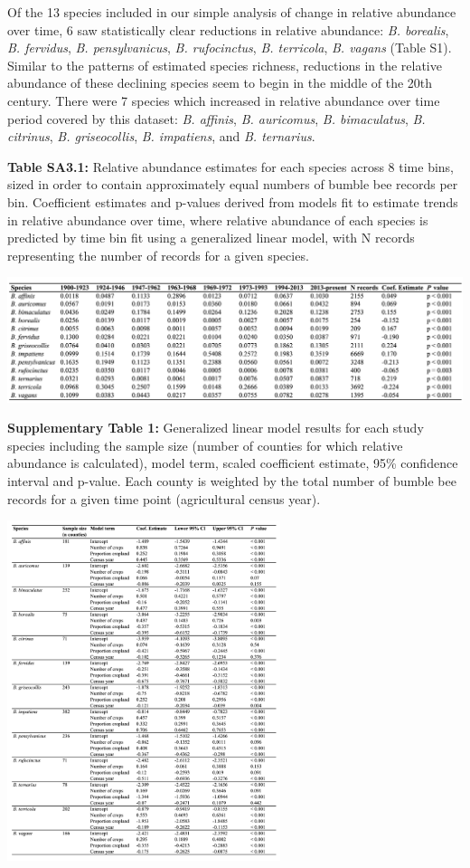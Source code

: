 \documentclass[11pt,]{article}
\begin{document}
Of the 13 species included in our simple analysis of change in relative
abundance over time, 6 saw statistically clear reductions in relative
abundance: \emph{B. borealis}, \emph{B. fervidus}, \emph{B.
pensylvanicus}, \emph{B. rufocinctus}, \emph{B. terricola}, \emph{B.
vagans} (Table S1). Similar to the patterns of estimated species
richness, reductions in the relative abundance of these declining
species seem to begin in the middle of the 20th century. There were 7
species which increased in relative abundance over time period covered
by this dataset: \emph{B. affinis}, \emph{B. auricomus}, \emph{B.
bimaculatus}, \emph{B. citrinus}, \emph{B. griseocollis}, \emph{B.
impatiens}, and \emph{B. ternarius}.

\textbf{Table SA3.1:} Relative abundance estimates for each species
across 8 time bins, sized in order to contain approximately equal
numbers of bumble bee records per bin. Coefficient estimates and
p-values derived from models fit to estimate trends in relative
abundance over time, where relative abundance of each species is
predicted by time bin fit using a generalized linear model, with N
records representing the number of records for a given species.

\includegraphics[width=1\textwidth,height=\textheight]{../ms_figs/table1.png}

\clearpage

\textbf{Supplementary Table 1:} Generalized linear model results for
each study species including the sample size (number of counties for
which relative abundance is calculated), model term, scaled coefficient
estimate, 95\% confidence interval and p-value. Each county is weighted
by the total number of bumble bee records for a given time point
(agricultural census year).

\includegraphics[width=0.6\textwidth,height=\textheight]{../ms_figs/tables1.png}
\end{document}
